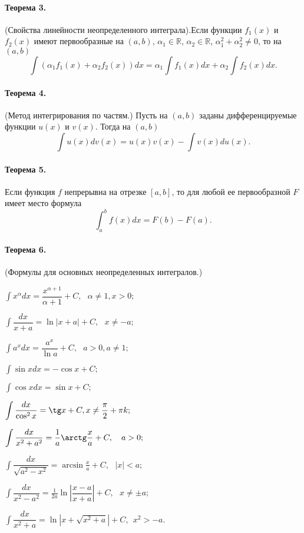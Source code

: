 \documentclass[a4paper,12pt]{article} %
\newcommand{\abs}[1]{\left|#1\right|}
\begin{document}
\paragraph{Теорема 3.} (Свойства линейности неопределенного
интеграла).Если функции $ f_1(x) $ и $ f_2(x) $ имеют
первообразные на $ (a, b) $, $ \alpha_1\in\mathbb{R} $, 
$ \alpha_2\in\mathbb{R} $, $ \alpha_1^2+\alpha_2^2\ne0 $, 
то на $ (a, b) $
\begin{equation}
	\int(\alpha_1f_1(x)+\alpha_2f_2(x))dx=
	\alpha_1\int f_1(x)dx+\alpha_2\int f_2(x)dx.
\end{equation}
\paragraph{Теорема 4.}(Метод интегрирования по частям.)
Пусть на $ (a, b) $ заданы дифференцируемые функции 
$ u(x) $ и $ v(x) $. Тогда на $ (a, b) $
\begin{equation}
	\int u(x)dv(x)=u(x)v(x)-\int v(x)du(x).
\end{equation}
\paragraph{Теорема 5.} Если функция $ f $ непрерывна на отрезке
$ [a, b] $, то для любой ее первообразной $ F $ имеет место формула
\begin{equation}
	\int_{a}^{b}f(x)dx=F(b)-F(a).
\end{equation}
\paragraph{Теорема 6.}(Формулы для основных неопределенных
интегралов.)
\begin{enumerate}
\begin{multicols}{2}
		\item $ \displaystyle\int x^{\alpha}dx=
		\dfrac{x^{\alpha+1}}{\alpha+1}+C, ~~~ \alpha\ne1, x>0;$
		\item $ \displaystyle\int\dfrac{dx}{x+a}=
		\ln\abs{x+a}+C, ~~~ x\ne -a; $
		\item $ \displaystyle\int a^xdx=
		\dfrac{a^x}{\ln a}+C, ~~~ a>0, a\ne1; $
		\item $ \displaystyle\int\sin xdx=-\cos x+C; $
		\item $ \displaystyle\int\cos xdx=\sin x+C; $
		\item $ \displaystyle\int\dfrac{dx}{\cos^2x}=
		\tg x+C, x\ne\frac{\pi}{2}+\pi k; $
		\item $ \displaystyle\int\dfrac{dx}{x^2+a^2}=
		\frac{1}{a}\arctg\frac{x}{a}+C, ~~~ a>0; $
		\item $  \displaystyle\int\dfrac{dx}{\sqrt{a^2-x^2}}=
		\arcsin \frac{x}{a}+C, ~~~ \abs{x}<a;$
		\item $  \displaystyle\int\dfrac{dx}{x^2-a^2}=
		\frac{1}{2a}\ln\abs{\dfrac{x-a}{x+a}}+C,~~~x\ne\pm a;$
		\item $  \displaystyle\int\dfrac{dx}{x^2+a}=
		\ln\abs{x+\sqrt{x^2+a}}+C,~~x^2>-a. $
\end{multicols}
\end{enumerate}
\end{document}
